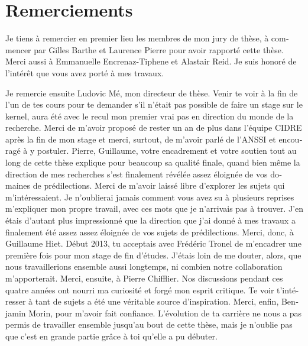 \chapter{Remerciements}

\begin{otherlanguage}{french}
  Je tiens à remercier en premier lieu les membres de mon jury de thèse, à
  commencer par Gilles Barthe et Laurence Pierre pour avoir rapporté cette
  thèse. Merci aussi à Emmanuelle Encrenaz-Tiphene et Alastair Reid. Je suis
  honoré de l’intérêt que vous avez porté à mes travaux.

  Je remercie ensuite Ludovic Mé, mon directeur de thèse. Venir te voir à la fin
  de l’un de tes cours pour te demander s’il n’était pas possible de faire un
  stage \og{}sur le kernel\fg{}, aura été avec le recul mon premier vrai pas en
  direction du monde de la recherche. Merci de m’avoir proposé de rester un an
  de plus dans l’équipe CIDRE après la fin de mon stage et merci, surtout, de
  m’avoir parlé de l’ANSSI et encouragé à y postuler.
  Pierre, Guillaume, votre encadrement et votre soutien tout au long de cette
  thèse explique pour beaucoup sa qualité finale, quand bien même la direction
  de mes recherches s’est finalement révélée assez éloignée de vos domaines de
  prédilections. Merci de m’avoir laissé libre d’explorer les sujets qui
  m’intéressaient. Je n’oublierai jamais comment vous avez su à plusieurs
  reprises m’expliquer mon propre travail, avec ces mots que je n'arrivais pas à
  trouver. J’en étais d’autant plus impressionné que la direction que j’ai donné
  à mes travaux a finalement été assez assez éloignée de vos sujets de
  prédilections.
  Merci, donc, à Guillaume Hiet. Début 2013, tu acceptais avec Frédéric Tronel
  de m’encadrer une première fois pour mon stage de fin d’études. J’étais loin
  de me douter, alors, que nous travaillerions ensemble aussi longtemps, ni
  combien notre collaboration m’apporterait.
  Merci, ensuite, à Pierre Chifflier. Nos discussions pendant ces quatre années
  ont nourri ma curiosité et forgé mon esprit critique. Te voir t’intéresser à
  tant de sujets a été une véritable source d’inspiration.
  Merci, enfin, Benjamin Morin, pour m'avoir fait confiance. L’évolution de ta
  carrière ne nous a pas permis de travailler ensemble jusqu’au bout de cette
  thèse, mais je n’oublie pas que c’est en grande partie grâce à toi qu’elle a
  pu débuter.


\end{otherlanguage}
